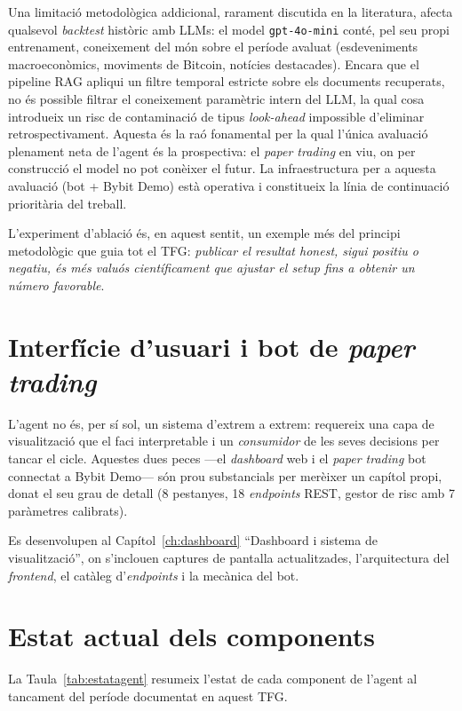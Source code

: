 \documentclass[12pt, a4paper]{report}
\begin{document}
Una limitació metodològica addicional, rarament discutida en la literatura, afecta qualsevol \textit{backtest} històric amb LLMs: el model \texttt{gpt-4o-mini} conté, pel seu propi entrenament, coneixement del món sobre el període avaluat (esdeveniments macroeconòmics, moviments de Bitcoin, notícies destacades). Encara que el pipeline RAG apliqui un filtre temporal estricte sobre els documents recuperats, no és possible filtrar el coneixement paramètric intern del LLM, la qual cosa introdueix un risc de contaminació de tipus \textit{look-ahead} impossible d'eliminar retrospectivament. Aquesta és la raó fonamental per la qual l'única avaluació plenament neta de l'agent és la prospectiva: el \textit{paper trading} en viu, on per construcció el model no pot conèixer el futur. La infraestructura per a aquesta avaluació (bot + Bybit Demo) està operativa i constitueix la línia de continuació prioritària del treball.

L'experiment d'ablació és, en aquest sentit, un exemple més del principi metodològic que guia tot el TFG: \emph{publicar el resultat honest, sigui positiu o negatiu, és més valuós científicament que ajustar el setup fins a obtenir un número favorable}.

\section{Interfície d'usuari i bot de \textit{paper trading}}

L'agent no és, per sí sol, un sistema d'extrem a extrem: requereix una capa de visualització que el faci interpretable i un \textit{consumidor} de les seves decisions per tancar el cicle. Aquestes dues peces ---el \textit{dashboard} web i el \textit{paper trading} bot connectat a Bybit Demo--- són prou substancials per merèixer un capítol propi, donat el seu grau de detall (8 pestanyes, 18 \textit{endpoints} REST, gestor de risc amb 7 paràmetres calibrats).

Es desenvolupen al Capítol~\ref{ch:dashboard} ``Dashboard i sistema de visualització'', on s'inclouen captures de pantalla actualitzades, l'arquitectura del \textit{frontend}, el catàleg d'\textit{endpoints} i la mecànica del bot.

\section{Estat actual dels components}

La Taula~\ref{tab:estatagent} resumeix l'estat de cada component de l'agent al tancament del període documentat en aquest TFG.
\end{document}
